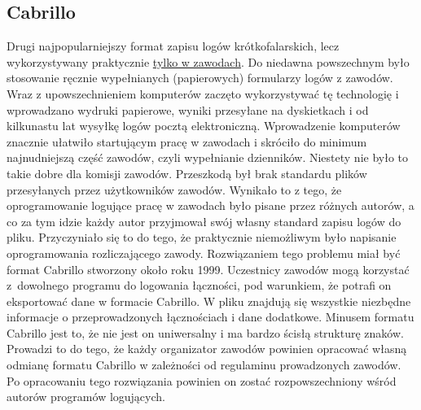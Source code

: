 \documentclass[]{mgr}
\begin{document}
            \subsection{Cabrillo}
            Drugi najpopularniejszy format zapisu logów krótkofalarskich, lecz wykorzystywany praktycznie \underline{tylko w zawodach}. Do niedawna powszechnym było stosowanie ręcznie wypełnianych (papierowych) formularzy logów z zawodów. Wraz z upowszechnieniem komputerów zaczęto wykorzystywać tę technologię i wprowadzano wydruki papierowe, wyniki przesyłane na dyskietkach i od kilkunastu lat wysyłkę logów pocztą elektroniczną. Wprowadzenie komputerów znacznie ułatwiło startującym pracę w zawodach i skróciło do minimum najnudniejszą część zawodów, czyli wypełnianie dzienników. Niestety nie było to takie dobre dla komisji zawodów. Przeszkodą był brak standardu plików przesyłanych przez użytkowników zawodów. Wynikało to z tego, że oprogramowanie logujące pracę w zawodach było pisane przez różnych autorów, a co za tym idzie każdy autor przyjmował swój własny standard zapisu logów do pliku. Przyczyniało się to do tego, że praktycznie niemożliwym było napisanie oprogramowania rozliczającego zawody. Rozwiązaniem tego problemu miał być format Cabrillo stworzony około roku 1999. Uczestnicy zawodów mogą korzystać z~dowolnego programu do logowania łączności, pod warunkiem, że potrafi on eksportować dane w formacie Cabrillo. W pliku znajdują się wszystkie niezbędne informacje o przeprowadzonych łącznościach i dane dodatkowe. Minusem formatu Cabrillo jest to, że nie jest on uniwersalny i ma bardzo ścisłą strukturę znaków. Prowadzi to do tego, że każdy organizator zawodów powinien opracować własną odmianę formatu Cabrillo w zależności od regulaminu prowadzonych zawodów. Po opracowaniu tego rozwiązania powinien on zostać rozpowszechniony wśród autorów programów logujących.
\end{document}
